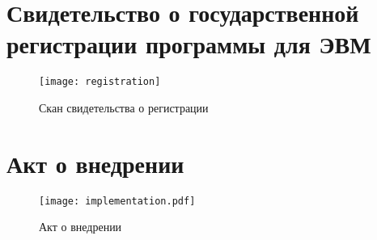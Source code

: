 \chapter{Свидетельство о государственной регистрации программы для ЭВМ}\label{ch:app1}


\begin{center}
    \begin{figure}[hb]
        \texttt{[image: registration]}
        \caption{Скан свидетельства о регистрации}\label{app:fig:registration}
    \end{figure}
\end{center}
    


\chapter{Акт о внедрении}\label{ch:app2}

\begin{center}
    \begin{figure}[hb]
        \texttt{[image: implementation.pdf]}
        \caption{Акт о внедрении}\label{app:fig:implementation}
    \end{figure}
\end{center}